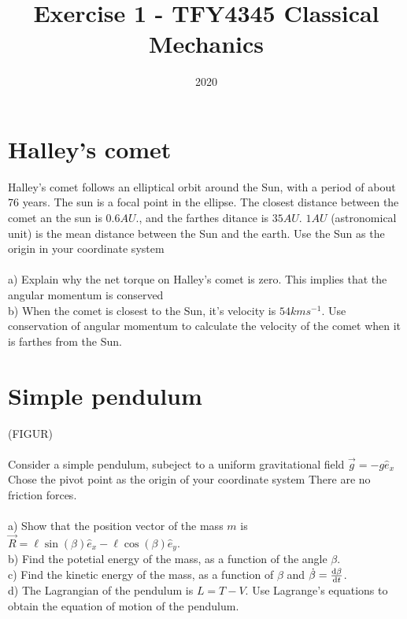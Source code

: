 \documentclass{article}
\title{Exercise 1 - TFY4345 Classical Mechanics}
\date{2020}
\begin{document}
    \maketitle
    \section{Halley's comet}
    Halley's comet follows an elliptical orbit around the Sun, with a period of about 76 years. The sun is a focal point in the ellipse. The closest distance between the comet an the sun is $0.6 \si{AU}$., and the farthes ditance is $35 \si{AU}$. $1 \si{AU}$ (astronomical unit) is the mean distance between the Sun and the earth. Use the Sun as the origin in your coordinate system\\ \\
    a) Explain why the net torque on Halley's comet is zero. This implies that the angular momentum is conserved \\
    b) When the comet is closest to the Sun, it's velocity is $54 \si{km} \si{s^{-1}}$. Use conservation of angular momentum to calculate the velocity of the comet when it is farthes from the Sun.

    \section{Simple pendulum}
    (FIGUR) \\ \\
    Consider a simple pendulum, subeject to a uniform gravitational field $\vec{g} = -g \hat e_x$ Chose the pivot point as the origin of your coordinate system There are no friction forces. \\ \\
    a) Show that the position vector of the mass $m$ is $\vec R = \ell \sin(\beta) \hat e_x - \ell \cos(\beta) \hat e_y$.  \\
    b) Find the potetial energy of the mass, as a function of the angle $\beta$. \\
    c) Find the kinetic energy of the mass, as a function of $\beta$ and $\dot \beta = \dv{\beta}{t}$. \\
    d) The Lagrangian of the pendulum is $L = T - V$. Use Lagrange's equations to obtain the equation of motion of the pendulum.
\end{document}
